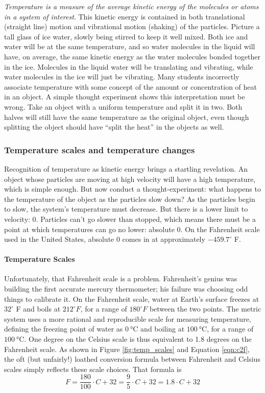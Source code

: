 \emph{Temperature is a measure of the average kinetic energy of the molecules or atoms in a system of interest}. This kinetic energy is contained in both translational (straight line) motion and vibrational motion (shaking) of the particles. Picture a tall glass of ice water, slowly being stirred to keep it well mixed. Both ice and water will be at the same temperature, and so water molecules in the liquid will have, on average, the same kinetic energy as the water molecules bonded together in the ice. Molecules in the liquid water will be translating and vibrating, while water molecules in the ice will just be vibrating. Many students incorrectly associate temperature with some concept of the amount or concentration of heat in an object. A simple thought experiment shows this interpretation must be wrong. Take an object with a uniform temperature and split it in two. Both halves will still have the same temperature as the original object, even though splitting the object should have ``split the heat'' in the objects as well. 

\subsubsection{Temperature scales and temperature changes}
Recognition of temperature as kinetic energy brings a startling revelation. An object whose particles are moving at high velocity will have a high temperature, which is simple enough. But now conduct a thought-experiment: what happens to the temperature of the object as the particles slow down? As the particles begin to slow, the system's temperature must decrease. But there is a lower limit to velocity: 0. Particles can't go slower than stopped, which means there must be a point at which temperatures can go no lower: absolute 0. On the Fahrenheit scale used in the United States, absolute 0 comes in at approximately $-459.7^{\circ}$ F.

\paragraph{Temperature Scales}
Unfortunately, that Fahrenheit scale is a problem. Fahrenheit's genius was building the first accurate mercury thermometer; his failure was choosing odd things to calibrate it. On the Fahrenheit scale, water at Earth's surface freezes at $32^{\circ}$ F and boils at $212^{\circ} F$, for a range of $180^{\circ} F$ between the two points. The metric system uses a more rational and reproducible scale for measuring temperature, defining the freezing point of water as $\SI{0}{\degreeCelsius}$ and boiling at $\SI{100}{\degreeCelsius}$, for a range of $\SI{100}{\degreeCelsius}$. One degree on the Celsius scale is thus equivalent to 1.8 degrees on the Fahrenheit scale. As shown in Figure \ref{fig:temp_scales} and Equation \ref{eqn:c2f}, the oft (but unfairly!) loathed conversion formula between Fahrenheit and Celsius scales simply reflects these scale choices. That formula is 
	\begin{equation}
	\label{eqn:c2f}
	F=\frac{180}{100}\cdot  C+ 32=\frac{9}{5}\cdot C+ 32=1.8\cdot C+ 32
	\end{equation}
	
